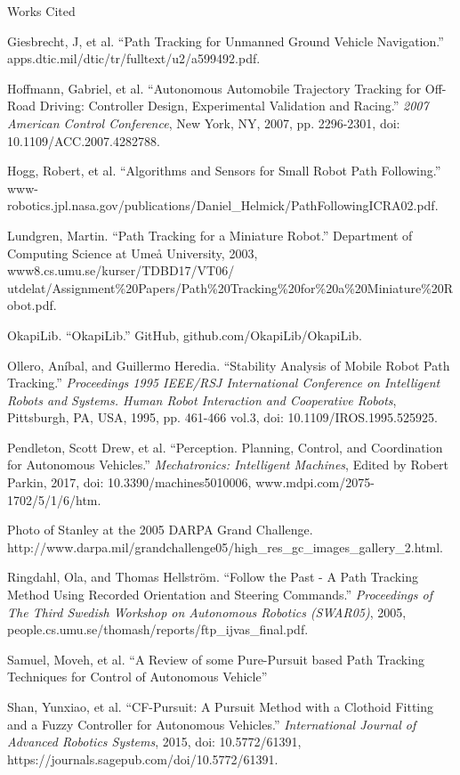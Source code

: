 \documentclass[12pt]{article}
\newcommand{\bibent}{\noindent \hangindent 40pt}
\newenvironment{workscited}{\newpage \begin{center} Works Cited \end{center}}{\newpage }
\begin{document}
\begin{flushleft}
\begin{workscited}
\bibent
Giesbrecht, J, et al. “Path Tracking for Unmanned Ground Vehicle Navigation.” apps.dtic.mil/dtic/tr/fulltext/u2/a599492.pdf.

\bibent
Hoffmann, Gabriel, et al. “Autonomous Automobile Trajectory Tracking for Off-Road Driving: Controller Design, Experimental Validation and Racing.” \textit{2007 American Control Conference}, New York, NY, 2007, pp. 2296-2301, doi: 10.1109/ACC.2007.4282788.

\bibent
Hogg, Robert, et al. “Algorithms and Sensors for Small Robot Path Following.” www-robotics.jpl.nasa.gov/publications/Daniel\_Helmick/PathFollowingICRA02.pdf.

\bibent
Lundgren, Martin. “Path Tracking for a Miniature Robot.” Department of Computing Science at Umeå University, 2003, www8.cs.umu.se/kurser/TDBD17/VT06/\\utdelat/Assignment\%20Papers/Path\%20Tracking\%20for\%20a\%20Miniature\%20Robot.pdf.

\bibent
OkapiLib. “OkapiLib.” GitHub, github.com/OkapiLib/OkapiLib.

\newpage

\bibent
Ollero, Aníbal, and Guillermo Heredia. “Stability Analysis of Mobile Robot Path Tracking.” \textit{Proceedings 1995 IEEE/RSJ International Conference on Intelligent Robots and Systems. Human Robot Interaction and Cooperative Robots}, Pittsburgh, PA, USA, 1995, pp. 461-466 vol.3, doi: 10.1109/IROS.1995.525925.

\bibent
Pendleton, Scott Drew, et al. “Perception. Planning, Control, and Coordination for Autonomous Vehicles.” \textit{Mechatronics: Intelligent Machines}, Edited by Robert Parkin, 2017, doi: 10.3390/machines5010006, www.mdpi.com/2075-1702/5/1/6/htm.

\bibent
Photo of Stanley at the 2005 DARPA Grand Challenge. http://www.darpa.mil/grandchallenge05/high\_res\_gc\_images\_gallery\_2.html.

\bibent
Ringdahl, Ola, and Thomas Hellström. “Follow the Past - A Path Tracking Method Using Recorded Orientation and Steering Commands.” \textit{Proceedings of The Third Swedish Workshop on Autonomous Robotics (SWAR05)}, 2005, people.cs.umu.se/thomash/reports/ftp\_ijvas\_final.pdf.

\bibent
Samuel, Moveh, et al. “A Review of some Pure-Pursuit based Path Tracking Techniques for Control of Autonomous Vehicle”

\bibent
Shan, Yunxiao, et al. “CF-Pursuit: A Pursuit Method with a Clothoid Fitting and a Fuzzy Controller for Autonomous Vehicles.” \textit{International Journal of Advanced Robotics Systems}, 2015, doi: 10.5772/61391, https://journals.sagepub.com/doi/10.5772/61391.


\end{workscited}
\end{flushleft}
\end{document}
